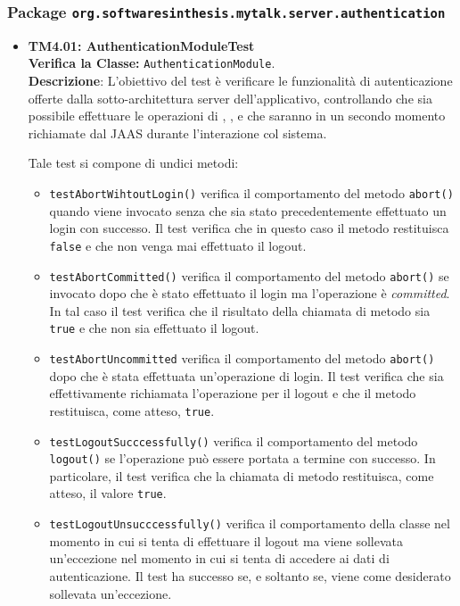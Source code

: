 \subsubsection{Package \texttt{org.softwaresinthesis.mytalk.server.authentication}}
\begin{itemize}

\item \textbf{TM4.01: AuthenticationModuleTest}\\
\textbf{Verifica la Classe:} \texttt{AuthenticationModule}.\\
\textbf{Descrizione}: L'obiettivo del test è verificare le funzionalità di autenticazione offerte dalla sotto-architettura server dell'applicativo, controllando che sia possibile effettuare le operazioni di , ,  e  che saranno in un secondo momento richiamate dal  JAAS durante l'interazione col sistema.

Tale test si compone di undici metodi:
\begin{itemize}
\item \texttt{testAbortWihtoutLogin()} verifica il comportamento del metodo \texttt{abort()} quando viene invocato senza che sia stato precedentemente effettuato un login con successo. Il test verifica che in questo caso il metodo restituisca \texttt{false} e che non venga mai effettuato il logout.

\item \texttt{testAbortCommitted()} verifica il comportamento del metodo \texttt{abort()} se invocato dopo che è stato effettuato il login ma l'operazione è \textit{committed}. In tal caso il test verifica che il risultato della chiamata di metodo sia \texttt{true} e che non sia effettuato il logout.

\item \texttt{testAbortUncommitted} verifica il comportamento del metodo \texttt{abort()} dopo che è stata effettuata un'operazione di login. Il test verifica che sia effettivamente richiamata l'operazione per il logout e che il metodo restituisca, come atteso, \texttt{true}.

\item \texttt{testLogoutSucccessfully()} verifica il comportamento del metodo \texttt{logout()} se l'operazione può essere portata a termine con successo. In particolare, il test verifica che la chiamata di metodo restituisca, come atteso, il valore \texttt{true}.

\item \texttt{testLogoutUnsucccessfully()} verifica il comportamento della classe nel momento in cui si tenta di effettuare il logout ma viene sollevata un'eccezione nel momento in cui si tenta di accedere ai dati di autenticazione. Il test ha successo se, e soltanto se, viene come desiderato sollevata un'eccezione.


\end{itemize}
\end{itemize}
